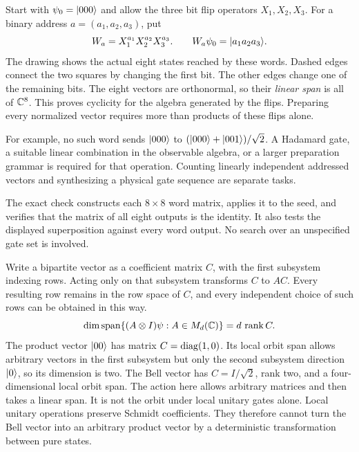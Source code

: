 Start with $\psi_0=\lvert 000\rangle$ and allow the three bit flip operators $X_1,X_2,X_3$. For a binary address $a=(a_1,a_2,a_3)$, put
\[
W_a=X_1^{a_1}X_2^{a_2}X_3^{a_3}.
\qquad W_a\psi_0=\lvert a_1a_2a_3\rangle.
\]
The drawing shows the actual eight states reached by these words. Dashed edges connect the two squares by changing the first bit. The other edges change one of the remaining bits.
The eight vectors are orthonormal, so their \emph{linear span} is all of $\mathbb C^8$. This proves cyclicity for the algebra generated by the flips. Preparing every normalized vector requires more than products of these flips alone.

For example, no such word sends $\lvert 000\rangle$ to $(\lvert 000\rangle+\lvert 001\rangle)/\sqrt2$. A Hadamard gate, a suitable linear combination in the observable algebra, or a larger preparation grammar is required for that operation. Counting linearly independent addressed vectors and synthesizing a physical gate sequence are separate tasks.

The exact check constructs each $8\times8$ word matrix, applies it to the seed, and verifies that the matrix of all eight outputs is the identity. It also tests the displayed superposition against every word output. No search over an unspecified gate set is involved.

Write a bipartite vector as a coefficient matrix $C$, with the first subsystem indexing rows. Acting only on that subsystem transforms $C$ to $AC$. Every resulting row remains in the row space of $C$, and every independent choice of such rows can be obtained in this way.
\[
\dim\operatorname{span}\{(A\otimes I)\psi:A\in M_d(\mathbb C)\}
=d\,\operatorname{rank} C.
\]
The product vector $\lvert 00\rangle$ has matrix $C=\operatorname{diag}(1,0)$. Its local orbit span allows arbitrary vectors in the first subsystem but only the second subsystem direction $\lvert 0\rangle$, so its dimension is two. The Bell vector has $C=I/\sqrt2$, rank two, and a four-dimensional local orbit span.
The action here allows arbitrary matrices and then takes a linear span. It is not the orbit under local unitary gates alone. Local unitary operations preserve Schmidt coefficients. They therefore cannot turn the Bell vector into an arbitrary product vector by a deterministic transformation between pure states.

